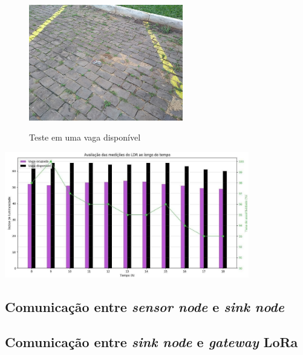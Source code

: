 \documentclass[oneside,openright,12pt]{ufsm_2015} %
\begin{document}
    \begin{figure}[H]
     	    \caption{\label{exepretex} Teste em uma vaga disponível}
            \centering
            \includegraphics[width=0.6\textwidth]{figuras/disponivel.jpg}
            \vspace{\baselineskip} %
            \label{fig:disponivel}
    \end{figure}
    
    \begin{grafico}[H]
     	    \caption{\label{exepretex} Avaliação das medições do LDR ao longo do tempo}
            \centering
            \includegraphics[width=0.8\textwidth]{figuras/ldr_graph.jpg}
            \vspace{\baselineskip} %
            \label{graph:ldr-aval}
    \end{grafico}
    
    \subsection{Comunicação entre \textit{sensor node} e \textit{sink node}}
    
    \subsection{Comunicação entre \textit{sink node} e \textit{gateway} LoRa}
    
\end{document}
